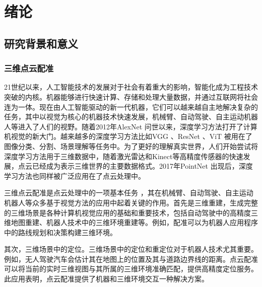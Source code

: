 %
%
%
%
%
%

\chapter{绪论}

\section{研究背景和意义}

\subsection{三维点云配准}
21世纪以来，人工智能技术的发展对于社会有着重大的影响，智能化成为工程技术突破的内核。机器能够进行快速计算、存储和处理大量数据，并通过互联网将社会连为一体。现在由人工智能驱动的新一代机器，它们可以越来越自主地解决复杂的任务，其中以视觉为核心的机器技术快速发展，机械臂、自动驾驶、自主运动机器人等进入了人们的视野。随着2012年AlexNet\cite{krizhevsky2017imagenet} 问世以来，深度学习方法打开了计算机视觉的新大门。越来越多的深度学习方法比如VGG\cite{simonyan2014very} 、ResNet\cite{he2016deep} 、ViT\cite{dosovitskiy2020image} 被用在了图像分类、分割、场景理解等任务中。为了更好的理解真实世界，人们开始尝试将深度学习方法用于三维数据中，随着激光雷达和Kinect等高精度传感器的快速发展，点云已经成为表示三维世界的主要数据格式。2017年PointNet\cite{qi2017pointnet} 出现后，深度学习方法也同样被广泛应用在了点云处理中。

三维点云配准是点云处理中的一项基本任务\cite{qi2017pointnet,besl1992method} ，其在机械臂、自动驾驶、自主运动机器人等众多基于视觉方法的应用中起着关键的作用。首先是三维重建，生成完整的三维场景是各种计算机视觉应用的基础和重要技术，包括自动驾驶中的高精度三维地图重建、机器人技术中的三维环境重建等。例如，配准可以为机器人应用程序中的路线规划和决策构建三维环境。

其次，三维场景中的定位。三维场景中的定位和重定位对于机器人技术尤其重要。例如，无人驾驶汽车会估计其在地图上的位置及其与道路边界线的距离。点云配准可以将当前的实时三维视图与其所属的三维环境准确匹配，提供高精度定位服务。此应用表明，点云配准提供了机器和三维环境交互一种解决方案。

